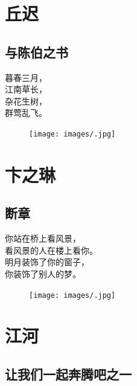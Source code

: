 \documentclass[]{book}
\renewenvironment{quote}{\begin{VF}}{\end{VF}}
\begin{document}
\chapter{丘迟}

\section{与陈伯之书}

\begin{quote}
暮春三月，\\
江南草长，\\
杂花生树，\\
群莺乱飞。
\end{quote}

\begin{figure}[htbp]
\centering
\texttt{[image: images/.jpg]}
\caption{}
\end{figure}

\chapter{卞之琳}

\section{断章}

\begin{quote}
你站在桥上看风景，\\
看风景的人在楼上看你。\\
明月装饰了你的窗子，\\
你装饰了别人的梦。
\end{quote}

\begin{figure}[htbp]
\centering
\texttt{[image: images/.jpg]}
\caption{}
\end{figure}

\chapter{江河}

\section{让我们一起奔腾吧之一}
\end{document}
